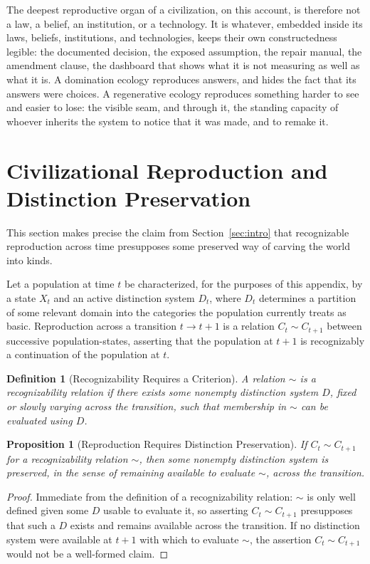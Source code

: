 \documentclass[11pt]{article}
\theoremstyle{plain}
\newtheorem{definition}{Definition}[section]
\newtheorem{proposition}{Proposition}[section]
\begin{document}
The deepest reproductive organ of a civilization, on this account, is therefore not a law, a belief, an institution, or a technology. It is whatever, embedded inside its laws, beliefs, institutions, and technologies, keeps their own constructedness legible: the documented decision, the exposed assumption, the repair manual, the amendment clause, the dashboard that shows what it is not measuring as well as what it is. A domination ecology reproduces answers, and hides the fact that its answers were choices. A regenerative ecology reproduces something harder to see and easier to lose: the visible seam, and through it, the standing capacity of whoever inherits the system to notice that it was made, and to remake it.

\appendix

\section{Civilizational Reproduction and Distinction Preservation}
\label{app:civilizational-reproduction}

\noindent This section makes precise the claim from Section~\ref{sec:intro} that recognizable reproduction across time presupposes some preserved way of carving the world into kinds.

Let a population at time $t$ be characterized, for the purposes of this appendix, by a state $X_t$ and an active distinction system $D_t$, where $D_t$ determines a partition of some relevant domain into the categories the population currently treats as basic. Reproduction across a transition $t \to t+1$ is a relation $C_t \sim C_{t+1}$ between successive population-states, asserting that the population at $t+1$ is recognizably a continuation of the population at $t$.

\begin{definition}[Recognizability Requires a Criterion]
A relation $\sim$ is a recognizability relation if there exists some nonempty distinction system $D$, fixed or slowly varying across the transition, such that membership in $\sim$ can be evaluated using $D$.
\end{definition}

\begin{proposition}[Reproduction Requires Distinction Preservation]
If $C_t \sim C_{t+1}$ for a recognizability relation $\sim$, then some nonempty distinction system is preserved, in the sense of remaining available to evaluate $\sim$, across the transition.
\end{proposition}
\begin{proof}
Immediate from the definition of a recognizability relation: $\sim$ is only well defined given some $D$ usable to evaluate it, so asserting $C_t \sim C_{t+1}$ presupposes that such a $D$ exists and remains available across the transition. If no distinction system were available at $t+1$ with which to evaluate $\sim$, the assertion $C_t \sim C_{t+1}$ would not be a well-formed claim.
\end{proof}
\end{document}

